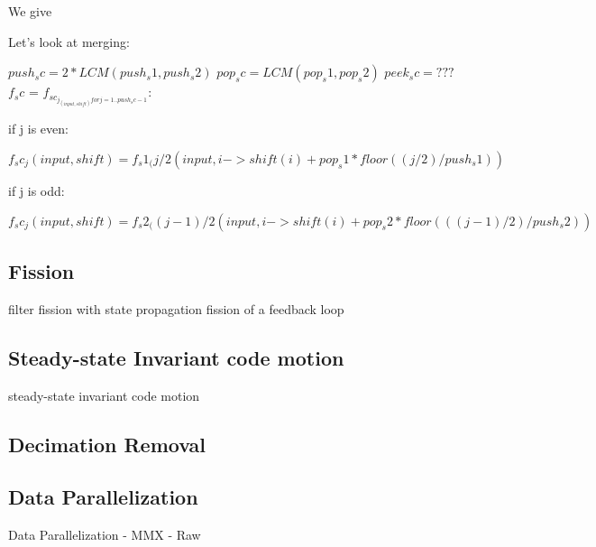 We give 

Let's look at merging:

$push_sc = 2*LCM(push_s1, push_s2)$
$pop_sc = LCM(pop_s1, pop_s2)$
$peek_sc = ???$
$f_sc$ = $f_{sc_{j_(input, shift) for j = 1..push_sc-1}}:$
	
  if j is even:

$f_sc_j(input, shift) = f_s1_(j/2 %
			(input,
			 i -> shift(i)+pop_s1*floor((j/2)/push_s1))$

  if j is odd:

$f_sc_j(input, shift) = f_s2_((j-1)/2 %
			(input,
			 i -> shift(i)+pop_s2*floor(((j-1)/2)/push_s2))$
\subsection{Fission}

filter fission with state propagation
fission of a feedback loop

\subsection{Steady-state Invariant code motion}

steady-state invariant code motion

\subsection{Decimation Removal}

\subsection{Data Parallelization}

Data Parallelization
-	MMX
-	Raw

